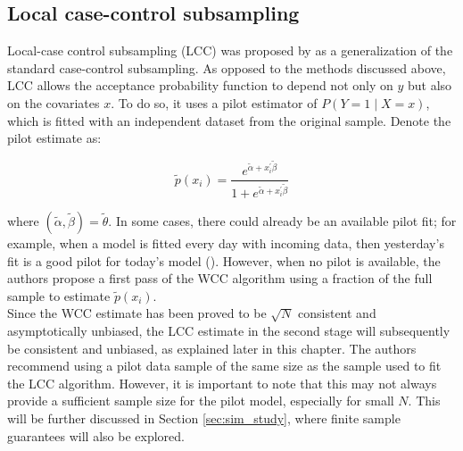 \subsection{Local case-control subsampling}
\label{sec:lcc}

Local-case control subsampling (LCC) was proposed by \textcite{hastie2014} as a generalization of the standard case-control subsampling. As opposed to the methods discussed above, LCC allows the acceptance probability function to depend not only on $y$ but also on the covariates $x$. To do so, it uses a pilot estimator of $P(Y=1 \mid X=x)$, which is fitted with an independent dataset from the original sample. Denote the pilot estimate as:

 

\begin{equation}
    \tilde{p}(x_i) = \frac{e^{\tilde{\alpha} + x_i^\prime \tilde{\beta}}}{1 + e^{\tilde{\alpha} + x_i^\prime \tilde{\beta}}}
    \label{eqn:pilot}
\end{equation}

where $(\tilde{\alpha}, \tilde{\beta}) = \tilde{\theta}$. In some cases, there could already be an available pilot fit; for example, when a model is fitted every day with incoming data, then yesterday's fit is a good pilot for today's model (\cite{hastie2014}). However, when no pilot is available, the authors propose a first pass of the WCC algorithm using a fraction of the full sample to estimate $\tilde{p}(x_i)$. \\

Since the WCC estimate has been proved to be $\sqrt{N}$ consistent and asymptotically unbiased, the LCC estimate in the second stage will subsequently be consistent and unbiased, as explained later in this chapter. The authors recommend using a pilot data sample of the same size as the sample used to fit the LCC algorithm. However, it is important to note that this may not always provide a sufficient sample size for the pilot model, especially for small $N$. This will be further discussed in Section \ref{sec:sim_study}, where finite sample guarantees will also be explored.\\

